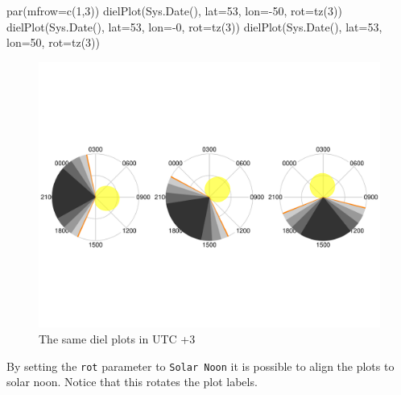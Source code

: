 \documentclass[
]{book}
\newenvironment{Shaded}{\begin{snugshade}}{\end{snugshade}}
\newcommand{\AttributeTok}[1]{\textcolor[rgb]{0.77,0.63,0.00}{#1}}
\newcommand{\DecValTok}[1]{\textcolor[rgb]{0.00,0.00,0.81}{#1}}
\newcommand{\FunctionTok}[1]{\textcolor[rgb]{0.00,0.00,0.00}{#1}}
\newcommand{\NormalTok}[1]{#1}
\newcommand{\SpecialCharTok}[1]{\textcolor[rgb]{0.00,0.00,0.00}{#1}}
\begin{document}
\begin{Shaded}
\begin{Highlighting}[]
\FunctionTok{par}\NormalTok{(}\AttributeTok{mfrow=}\FunctionTok{c}\NormalTok{(}\DecValTok{1}\NormalTok{,}\DecValTok{3}\NormalTok{))}
\FunctionTok{dielPlot}\NormalTok{(}\FunctionTok{Sys.Date}\NormalTok{(), }\AttributeTok{lat=}\DecValTok{53}\NormalTok{, }\AttributeTok{lon=}\SpecialCharTok{{-}}\DecValTok{50}\NormalTok{, }\AttributeTok{rot=}\FunctionTok{tz}\NormalTok{(}\DecValTok{3}\NormalTok{))}
\FunctionTok{dielPlot}\NormalTok{(}\FunctionTok{Sys.Date}\NormalTok{(), }\AttributeTok{lat=}\DecValTok{53}\NormalTok{, }\AttributeTok{lon=}\SpecialCharTok{{-}}\DecValTok{0}\NormalTok{, }\AttributeTok{rot=}\FunctionTok{tz}\NormalTok{(}\DecValTok{3}\NormalTok{))}
\FunctionTok{dielPlot}\NormalTok{(}\FunctionTok{Sys.Date}\NormalTok{(), }\AttributeTok{lat=}\DecValTok{53}\NormalTok{, }\AttributeTok{lon=}\DecValTok{50}\NormalTok{, }\AttributeTok{rot=}\FunctionTok{tz}\NormalTok{(}\DecValTok{3}\NormalTok{))}
\end{Highlighting}
\end{Shaded}

\begin{figure}

{\centering \includegraphics[width=0.9\linewidth]{_main_files/figure-latex/diel-plot-tz-1} 

}

\caption{The same diel plots in UTC +3}\label{fig:diel-plot-tz}
\end{figure}

By setting the \texttt{rot} parameter to \texttt{Solar\ Noon} it is possible to align the plots to solar noon. Notice that this rotates the plot labels.
\end{document}
